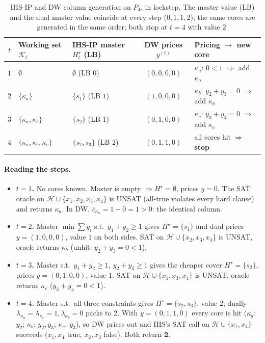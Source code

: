\begin{table}[htbp]
\centering
\small
\begin{tabular}{c l l c l}
\toprule
$t$ & Working set $\mathcal{K}_t$ & IHS-IP master $H_t^\star$ (LB) & DW prices $y^{(t)}$ & Pricing $\to$ new core \\
\midrule
$1$ & $\emptyset$ & $\emptyset$ \;(LB $0$) & $(0,0,0,0)$ & $\kappa_a$: $0<1$ \;$\Rightarrow$ add $\kappa_a$\\
$2$ & $\{\kappa_a\}$ & $\{s_1\}$ \;(LB $1$) & $(1,0,0,0)$ & $\kappa_b$: $y_2{+}y_3{=}0$ \;$\Rightarrow$ add $\kappa_b$\\
$3$ & $\{\kappa_a,\kappa_b\}$ & $\{s_2\}$ \;(LB $1$) & $(0,1,0,0)$ & $\kappa_c$: $y_3{+}y_4{=}0$ \;$\Rightarrow$ add $\kappa_c$\\
$4$ & $\{\kappa_a,\kappa_b,\kappa_c\}$ & $\{s_2,s_3\}$ \;(LB $2$) & $(0,1,1,0)$ & all cores hit \;$\Rightarrow$ \textbf{stop} \\
\bottomrule
\end{tabular}
\caption{IHS-IP and DW column generation on $P_4$, in lockstep. The master
value (LB) and the dual master value coincide at every step ($0,1,1,2$); the
same cores are generated in the same order; both stop at $t=4$ with value $2$.}
\label{tab:trace-p4}
\end{table}

\paragraph{Reading the steps.}
\begin{itemize}
\item \textbf{$t=1$.} No cores known. Master is empty $\Rightarrow H^\star =
\emptyset$, prices $y=0$. The SAT oracle on $\mathcal{H}\cup\{x_1,x_2,x_3,x_4\}$
is UNSAT (all-true violates every hard clause) and returns $\kappa_a$. In DW,
$\bar c_{\kappa_a} = 1 - 0 = 1 > 0$: the identical column.
\item \textbf{$t=2$.} Master $\min \sum y_i$ s.t.\ $y_1+y_2 \ge 1$ gives
$H^\star=\{s_1\}$ and dual prices $y=(1,0,0,0)$, value $1$ on both sides.
SAT on $\mathcal{H}\cup\{x_2,x_3,x_4\}$ is UNSAT, oracle returns $\kappa_b$
(unhit: $y_2+y_3 = 0 < 1$).
\item \textbf{$t=3$.} Master s.t.\ $y_1+y_2\ge1,\ y_2+y_3\ge1$ gives the cheaper
cover $H^\star=\{s_2\}$, prices $y=(0,1,0,0)$, value $1$. SAT on
$\mathcal{H}\cup\{x_1,x_3,x_4\}$ is UNSAT, oracle returns $\kappa_c$
($y_3+y_4 = 0 < 1$).
\item \textbf{$t=4$.} Master s.t.\ all three constraints gives $H^\star=\{s_2,s_3\}$,
value $2$; dually $\lambda_{\kappa_a}=\lambda_{\kappa_c}=1,\lambda_{\kappa_b}=0$
packs to $2$. With $y=(0,1,1,0)$ every core is hit ($\kappa_a$: $y_2$; $\kappa_b$:
$y_2,y_3$; $\kappa_c$: $y_3$), so DW prices out and IHS's SAT call on
$\mathcal{H}\cup\{x_1,x_4\}$ succeeds ($x_1,x_4$ true, $x_2,x_3$ false). Both
return $\mathbf 2$.
\end{itemize}

